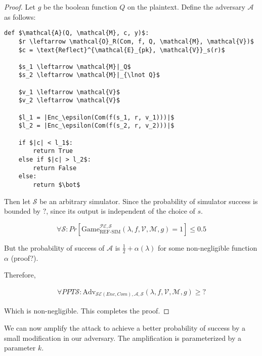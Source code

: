 \documentclass{article}
\begin{document}
\begin{proof}

Let $g$ be the boolean function $Q$ on the plaintext. Define the adversary
$\mathcal{A}$ as follows:

\begin{lstlisting}[texcl,mathescape]
def $\mathcal{A}(Q, \mathcal{M}, c, y)$:
    $r \leftarrow \mathcal{O}_R(Com, f, Q, \mathcal{M}, \mathcal{V})$
    $c = \text{Reflect}^{\mathcal{E}_{pk}, \mathcal{V}}_s(r)$

    $s_1 \leftarrow \mathcal{M}|_Q$
    $s_2 \leftarrow \mathcal{M}|_{\lnot Q}$

    $v_1 \leftarrow \mathcal{V}$
    $v_2 \leftarrow \mathcal{V}$

    $l_1 = |Enc_\epsilon(Com(f(s_1, r, v_1)))|$
    $l_2 = |Enc_\epsilon(Com(f(s_2, r, v_2)))|$

    if $|c| < l_1$:
        return True
    else if $|c| > l_2$:
        return False
    else:
        return $\bot$
\end{lstlisting}

Then let $\mathcal{S}$ be an arbitrary simulator. Since the probability of simulator
success is bounded by $?$, since its output is independent of the choice of
$s$.

\begin{equation}
    \forall \mathcal{S}:
    Pr[\text{Game}_{\text{REF-SIM}}^{\mathcal{PE},\mathcal{S}}(\lambda, f, \mathcal{V}, \mathcal{M}, g) = 1] \leq 0.5
\end{equation}

But the probability of success of $\mathcal{A}$ is $\frac{1}{2} +
\alpha(\lambda)$ for some non-negligible function $\alpha$ (proof?).

Therefore,

\begin{equation}
\begin{split}
    \forall PPT \mathcal{S}:
    \text{Adv}_{\mathcal{SE}(Enc, Com), \mathcal{A}, \mathcal{S}}(\lambda, f, \mathcal{V}, \mathcal{M}, g) \geq ?
\end{split}
\end{equation}

Which is non-negligible. This completes the proof.

\end{proof}

We can now amplify the attack to achieve a better probability of success by a
small modification in our adversary. The amplification is parameterized by a
parameter $k$.
\end{document}
